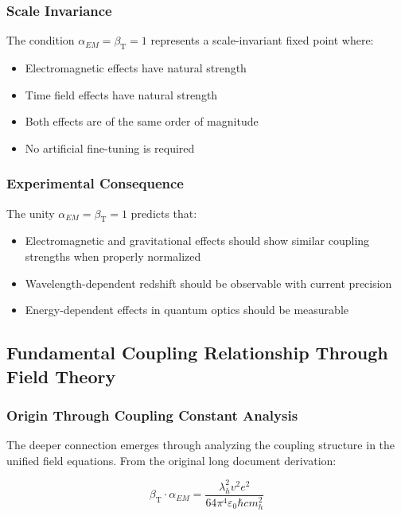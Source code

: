 \documentclass[12pt,a4paper]{article}
\newcommand{\betaT}{\beta_{\text{T}}}
\begin{document}
	\subsubsection{Scale Invariance}
	\label{subsubsec:scale_invariance}
	
	The condition $\alpha_{EM} = \betaT = 1$ represents a scale-invariant fixed point where:
	\begin{itemize}
		\item Electromagnetic effects have natural strength
		\item Time field effects have natural strength  
		\item Both effects are of the same order of magnitude
		\item No artificial fine-tuning is required
	\end{itemize}
	
	\subsubsection{Experimental Consequence}
	\label{subsubsec:experimental_consequence}
	
	The unity $\alpha_{EM} = \betaT = 1$ predicts that:
	\begin{itemize}
		\item Electromagnetic and gravitational effects should show similar coupling strengths when properly normalized
		\item Wavelength-dependent redshift should be observable with current precision
		\item Energy-dependent effects in quantum optics should be measurable
	\end{itemize}
	
	\subsection{Fundamental Coupling Relationship Through Field Theory}
	\label{subsec:fundamental_coupling_relationship}
	
	\subsubsection{Origin Through Coupling Constant Analysis}
	\label{subsubsec:coupling_constant_analysis}
	
	The deeper connection emerges through analyzing the coupling structure in the unified field equations. From the original long document derivation:
	
	\begin{equation}
		\betaT \cdot \alpha_{EM} = \frac{\lambda_h^2 v^2 e^2}{64\pi^4\varepsilon_0\hbar c m_h^2}
	\end{equation}
	
\end{document}
